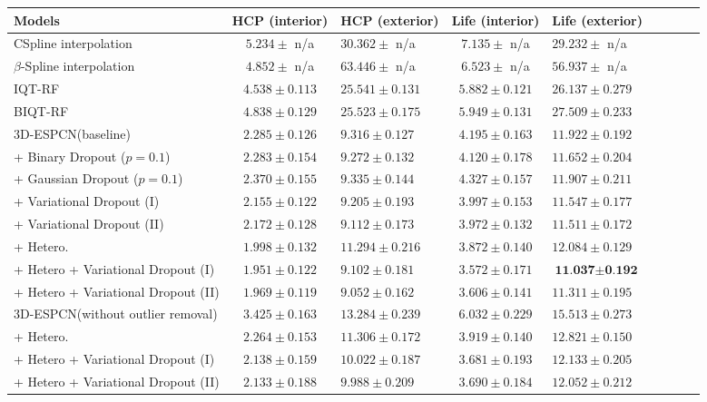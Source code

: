 \begin{table}
	\center
	\footnotesize
	\begin{tabular}{@{}lclclclcl}
		\hline
		Models & HCP (interior) & HCP (exterior)& Life (interior) & Life (exterior)   \\ 
		\hline	
		CSpline interpolation& $5.234 \pm$ n/a & $30.362\pm$ n/a & $7.135\pm$ n/a & $29.232\pm$ n/a  \\
		$\beta$-Spline interpolation &  $4.852 \pm$ n/a  &  $63.446\pm$ n/a & $6.523\pm$ n/a &  $56.937\pm$ n/a \\
		IQT-RF \cite{alexander2017image}&   $4.538 \pm 0.113$& $25.541\pm0.131$  & $5.882\pm0.121$  & $26.137\pm0.279$   \\ 
		BIQT-RF \cite{tanno2016bayesian} & $4.838 \pm 0.129$  &$25.523\pm0.175$  & $5.949\pm0.131$ &$27.509\pm0.233$ \\
				
		\hline
		3D-ESPCN(baseline)  & $2.285 \pm0.126$   & $9.316\pm0.127$ & $4.195 \pm0.163$ & $11.922 \pm0.192$ \\
		+ Binary Dropout ($p=0.1$) &    $2.283 \pm0.154$	 & $9.272\pm0.132$ & $4.120 \pm0.178$ &	$11.652 \pm0.204$	\\
		+ Gaussian Dropout ($p=0.1$)  &    $2.370 \pm0.155$	& 	$9.335\pm0.144$	& 	$4.327\pm0.157$	&	$11.907 \pm0.211$	\\
		+ Variational Dropout (I)& $2.155\pm0.122$ &   $9.205\pm0.193$ 	& 	$3.997 \pm0.153$  & $11.547 \pm0.177$ 	\\
		+ Variational Dropout (II)& $2.172\pm0.128$ &  $9.112\pm0.173$  &  $3.972 \pm0.132$ &  $11.511 \pm0.172$ & \\
		+ Hetero. &$1.998\pm0.132 $ & $11.294\pm 0.216$  & $3.872 \pm0.140$   & $12.084 \pm0.129$\\
		+ Hetero + Variational Dropout (I) &\cellcolor{red!15} $1.951 \pm 0.122$ & \cellcolor{blue!15}$9.102\pm0.181$ & \cellcolor{red!15} $3.572\pm0.171$  &\cellcolor{red!15}$\textbf{11.037} \pm\textbf{0.192}$  \\ 
		+ Hetero + Variational Dropout (II)&\cellcolor{blue!15} $1.969 \pm 0.119$ &\cellcolor{red!15}$9.052\pm0.162$& \cellcolor{blue!15} $3.606 \pm0.141$ & \cellcolor{blue!15}$11.311 \pm0.195$  \\
		\hline
		3D-ESPCN(without outlier removal)  & $3.425 \pm0.163$   & $13.284\pm0.239$ & $6.032 \pm0.229$ & $15.5 13 \pm0.273$ \\
		+ Hetero. &$2.264\pm0.153 $ & $11.306\pm 0.172$  & $3.919 \pm0.140$   & $12.821 \pm0.150$\\
		+ Hetero + Variational Dropout (I) & $2.138 \pm0.159$ & $10.022\pm0.187$ &  $3.681\pm0.193$  &$12.133 \pm 0.205 $  \\ 
		+ Hetero + Variational Dropout (II)& $2.133 \pm 0.188$ & $ 9.988 \pm 0.209$&  $3.690 \pm0.184$ & $12.052 \pm0.212$  \\
		\hline
	

\end{tabular}
\end{table}
